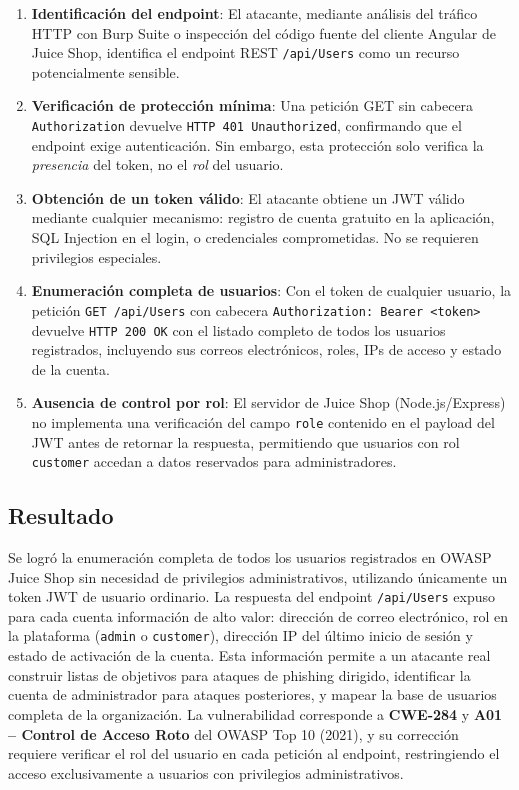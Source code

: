 \documentclass[12pt, letterpaper]{article}
\begin{document}
\begin{enumerate}
  \item \textbf{Identificación del endpoint}: El atacante, mediante análisis del tráfico HTTP con Burp Suite o inspección del código fuente del cliente Angular de Juice Shop, identifica el endpoint REST \texttt{/api/Users} como un recurso potencialmente sensible.
  \item \textbf{Verificación de protección mínima}: Una petición GET sin cabecera \texttt{Authorization} devuelve \texttt{HTTP 401 Unauthorized}, confirmando que el endpoint exige autenticación. Sin embargo, esta protección solo verifica la \textit{presencia} del token, no el \textit{rol} del usuario.
  \item \textbf{Obtención de un token válido}: El atacante obtiene un JWT válido mediante cualquier mecanismo: registro de cuenta gratuito en la aplicación, SQL Injection en el login, o credenciales comprometidas. No se requieren privilegios especiales.
  \item \textbf{Enumeración completa de usuarios}: Con el token de cualquier usuario, la petición \texttt{GET /api/Users} con cabecera \texttt{Authorization: Bearer <token>} devuelve \texttt{HTTP 200 OK} con el listado completo de todos los usuarios registrados, incluyendo sus correos electrónicos, roles, IPs de acceso y estado de la cuenta.
  \item \textbf{Ausencia de control por rol}: El servidor de Juice Shop (Node.js/Express) no implementa una verificación del campo \texttt{role} contenido en el payload del JWT antes de retornar la respuesta, permitiendo que usuarios con rol \texttt{customer} accedan a datos reservados para administradores.
\end{enumerate}

\subsection{Resultado}

Se logró la enumeración completa de todos los usuarios registrados en OWASP Juice Shop sin necesidad de privilegios administrativos, utilizando únicamente un token JWT de usuario ordinario. La respuesta del endpoint \texttt{/api/Users} expuso para cada cuenta información de alto valor: dirección de correo electrónico, rol en la plataforma (\texttt{admin} o \texttt{customer}), dirección IP del último inicio de sesión y estado de activación de la cuenta. Esta información permite a un atacante real construir listas de objetivos para ataques de phishing dirigido, identificar la cuenta de administrador para ataques posteriores, y mapear la base de usuarios completa de la organización. La vulnerabilidad corresponde a \textbf{CWE-284} y \textbf{A01 -- Control de Acceso Roto} del OWASP Top 10 (2021), y su corrección requiere verificar el rol del usuario en cada petición al endpoint, restringiendo el acceso exclusivamente a usuarios con privilegios administrativos.

\end{document}
